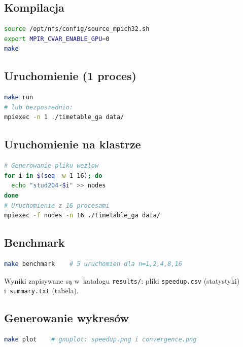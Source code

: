 \documentclass[12pt,a4paper]{article}
\begin{document}
\subsection{Kompilacja}

\begin{lstlisting}[language=bash, numbers=none]
source /opt/nfs/config/source_mpich32.sh
export MPIR_CVAR_ENABLE_GPU=0
make
\end{lstlisting}

\subsection{Uruchomienie (1 proces)}

\begin{lstlisting}[language=bash, numbers=none]
make run
# lub bezposrednio:
mpiexec -n 1 ./timetable_ga data/
\end{lstlisting}

\subsection{Uruchomienie na klastrze}

\begin{lstlisting}[language=bash, numbers=none]
# Generowanie pliku wezlow
for i in $(seq -w 1 16); do
  echo "stud204-$i" >> nodes
done
# Uruchomienie z 16 procesami
mpiexec -f nodes -n 16 ./timetable_ga data/
\end{lstlisting}

\subsection{Benchmark}

\begin{lstlisting}[language=bash, numbers=none]
make benchmark    # 5 uruchomien dla n=1,2,4,8,16
\end{lstlisting}

Wyniki zapisywane s\k{a} w~katalogu \texttt{results/}: pliki \texttt{speedup.csv} (statystyki) i~\texttt{summary.txt} (tabela).

\subsection{Generowanie wykres\'{o}w}

\begin{lstlisting}[language=bash, numbers=none]
make plot    # gnuplot: speedup.png i convergence.png
\end{lstlisting}
\end{document}
